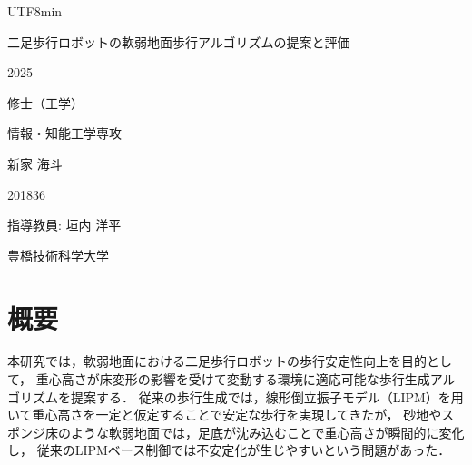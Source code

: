 \documentclass[a4paper,11pt]{report}
\newcommand{\thesistitle}{二足歩行ロボットの軟弱地面歩行アルゴリズムの提案と評価}
\newcommand{\thesisyear}{2025}                %
\newcommand{\thesisdegree}{修士（工学）}     %
\newcommand{\major}{情報・知能工学専攻}      %
\newcommand{\authorname}{新家 海斗}          %
\newcommand{\studentid}{201836}          %
\newcommand{\advisor}{指導教員: 垣内 洋平}   %
\newcommand{\university}{豊橋技術科学大学}   %
\begin{document}
\begin{CJK}{UTF8}{min}

\begin{titlepage}
  \begin{center}
    \vspace*{60mm}

    {\LARGE \thesistitle \par} %

    \vspace{20mm}

    {\Large \thesisyear \par}

    \vspace{5mm}

    {\Large \thesisdegree \par}

    \vspace{5mm}

    {\Large \major \par}

    \vspace{15mm}

    {\Large \authorname \par}

    \vspace{3mm}

    {\Large \studentid \par}

    \vspace{10mm}

    {\Large \advisor \par}

    \vspace{15mm}

    {\Large \university \par}

  \end{center}
\end{titlepage}

\chapter*{概要}

本研究では，軟弱地面における二足歩行ロボットの歩行安定性向上を目的として，
重心高さが床変形の影響を受けて変動する環境に適応可能な歩行生成アルゴリズムを提案する．
従来の歩行生成では，線形倒立振子モデル（LIPM）を用いて重心高さを一定と仮定することで安定な歩行を実現してきたが，
砂地やスポンジ床のような軟弱地面では，足底が沈み込むことで重心高さが瞬間的に変化し，
従来のLIPMベース制御では不安定化が生じやすいという問題があった．


\end{CJK}
\end{document}
